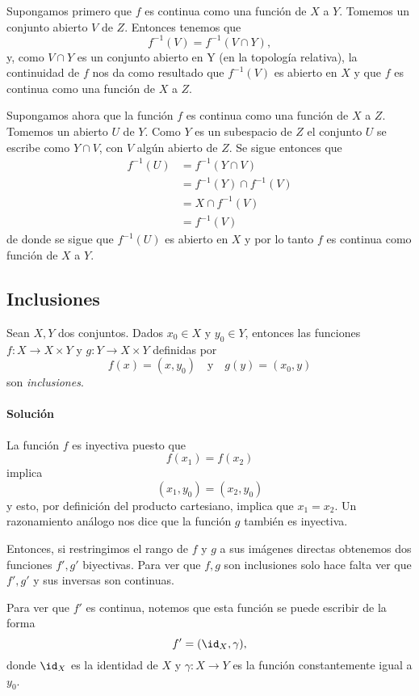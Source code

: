 \documentclass[a5paper,10pt,final]{extarticle}
\let\footnote\null
\begin{document}
Supongamos primero que $f$ es continua como una función de $X$ a $Y$. Tomemos un conjunto abierto $V$ de $Z$. Entonces tenemos que
\[ f^{-1}(V)=f^{-1}(V\cap Y),\]
y, como $V\cap Y$ es un conjunto abierto en Y (en la topología relativa),
la continuidad de $f$ nos da como resultado que $f^{-1}(V)$ es abierto en $X$ y que $f$ es continua como una función de $X$ a $Z$.

Supongamos ahora que la función $f$ es continua como una función de $X$ a $Z$. Tomemos un abierto $U$ de $Y$. Como $Y$ es un subespacio de $Z$ el conjunto $U$ se escribe como $Y\cap V$, con $V$ algún abierto de $Z$.
Se sigue entonces que
\begin{align*}
	f^{-1}(U) &= f^{-1}(Y\cap V)\\
	          &= f^{-1}(Y) \cap f^{-1}(V)\\
	          &= X\cap f^{-1}(V)\\
	          &= f^{-1}(V)
\end{align*}
de donde se sigue que $f^{-1}(U)$ es abierto en $X$ y por lo tanto $f$ es continua como función de $X$ a $Y$.

\subsection{Inclusiones}

Sean $X,Y$ dos conjuntos. Dados $x_0\in X$ y $y_0\in Y$, entonces las funciones $f:X\to X\times Y$ y 
$g: Y\to X\times Y$ definidas por
\[
f(x)=(x,y_0)\quad\text{y}\quad g(y)=(x_0,y)
\]
son \emph{inclusiones}\footnote{Ejercicio tomado del Munkres \cite[\S18, Nº 4]{munkres_topology_2014}.}.

\paragraph{Solución}

La función $f$ es inyectiva puesto que
\[
f(x_1)=f(x_2)
\]
implica
\[
(x_1,y_0)=(x_2,y_0)
\]
y esto, por definición del producto cartesiano, implica
que $x_1=x_2$. Un razonamiento análogo nos dice que la
función $g$ también es inyectiva.

Entonces, si restringimos el rango de $f$ y $g$ a sus
imágenes directas obtenemos dos funciones $f',g'$
biyectivas. Para ver que $f,g$ son inclusiones solo
hace falta ver que $f',g'$ y sus inversas son
continuas.

Para ver que $f'$ es continua, notemos que esta función
se puede escribir de la forma
\[
f'=(\id_X,\gamma),
\]
donde $\id_X$ es la identidad de $X$ y $\gamma:X\to Y$ 
es la función constantemente igual a $y_0$.
\end{document}

